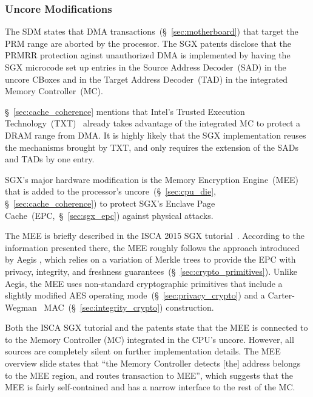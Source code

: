 \subsubsection{Uncore Modifications}

The SDM states that DMA transactions~(\S~\ref{sec:motherboard}) that target the
PRM range are aborted by the processor. The SGX patents disclose that the PRMRR
protection aginst unauthorized DMA is implemented by having the SGX microcode
set up entries in the Source Address Decoder~(SAD) in the uncore CBoxes and in
the Target Address Decoder~(TAD) in the integrated Memory Controller~(MC).

\S~\ref{sec:cache_coherence} mentions that Intel's Trusted Execution
Technology~(TXT)~\cite{grawrock2009txt} already takes advantage of the
integrated MC to protect a DRAM range from DMA. It is highly likely that the
SGX implementation reuses the mechanisms brought by TXT, and only requires the
extension of the SADs and TADs by one entry.

SGX's major hardware modification is the Memory Encryption Engine~(MEE) that is
added to the processor's uncore~(\S~\ref{sec:cpu_die},
\S~\ref{sec:cache_coherence}) to protect SGX's Enclave Page
Cache~(EPC,~\S~\ref{sec:sgx_epc}) against physical attacks.


The MEE is briefly described in the ISCA 2015 SGX
tutorial~\cite{intel2015iscasgx}. According to the information presented there,
the MEE roughly follows the approach introduced by Aegis \cite{suh2003aegis}
\cite{aegis_impl}, which relies on a variation of Merkle trees to provide the
EPC with privacy, integrity, and freshness
guarantees~(\S~\ref{sec:crypto_primitives}). Unlike Aegis, the MEE uses
non-standard cryptographic primitives that include a slightly modified AES
operating mode~(\S~\ref{sec:privacy_crypto}) and a
Carter-Wegman~\cite{carter1977mac, wegman1981mac}
MAC~(\S~\ref{sec:integrity_crypto}) construction.


Both the ISCA SGX tutorial and the patents state that the MEE is connected to
to the Memory Controller (MC) integrated in the CPU's uncore. However, all
sources are completely silent on further implementation details. The
MEE overview slide states that ``the Memory Controller detects [the] address
belongs to the MEE region, and routes transaction to MEE'', which suggests that
the MEE is fairly self-contained and has a narrow interface to the rest of the
MC.


